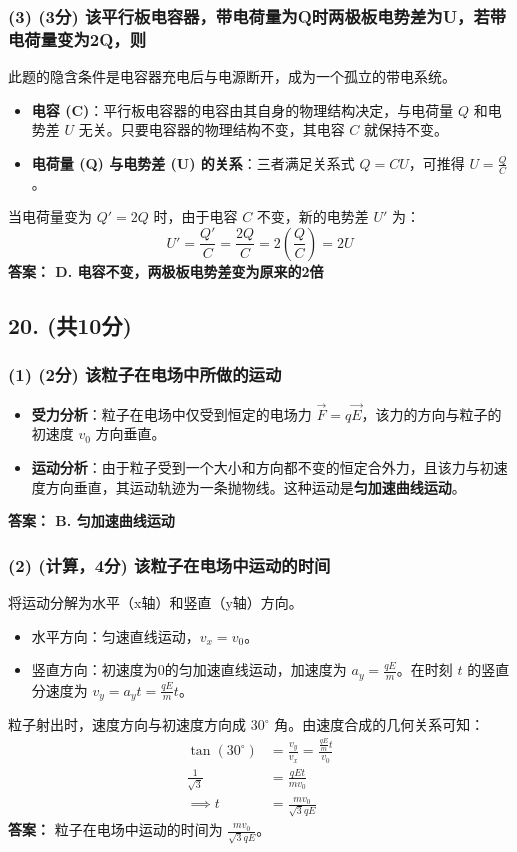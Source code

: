 \documentclass[12pt]{article}
\begin{document}
\subsubsection*{(3) (3分) 该平行板电容器，带电荷量为Q时两极板电势差为U，若带电荷量变为2Q，则}
此题的隐含条件是电容器充电后与电源断开，成为一个孤立的带电系统。
\begin{itemize}
    \item \textbf{电容 (C)}：平行板电容器的电容由其自身的物理结构决定，与电荷量 $Q$ 和电势差 $U$ 无关。只要电容器的物理结构不变，其电容 $C$ 就保持不变。
    \item \textbf{电荷量 (Q) 与电势差 (U) 的关系}：三者满足关系式 $Q = CU$，可推得 $U = \frac{Q}{C}$。
\end{itemize}
当电荷量变为 $Q' = 2Q$ 时，由于电容 $C$ 不变，新的电势差 $U'$ 为：
\[ U' = \frac{Q'}{C} = \frac{2Q}{C} = 2 \left(\frac{Q}{C}\right) = 2U \]
\textbf{答案： D. 电容不变，两极板电势差变为原来的2倍}

\subsection*{20. (共10分)}

\subsubsection*{(1) (2分) 该粒子在电场中所做的运动}
\begin{itemize}
    \item \textbf{受力分析}：粒子在电场中仅受到恒定的电场力 $\vec{F} = q\vec{E}$，该力的方向与粒子的初速度 $v_0$ 方向垂直。
    \item \textbf{运动分析}：由于粒子受到一个大小和方向都不变的恒定合外力，且该力与初速度方向垂直，其运动轨迹为一条抛物线。这种运动是\textbf{匀加速曲线运动}。
\end{itemize}
\textbf{答案： B. 匀加速曲线运动}

\subsubsection*{(2) (计算，4分) 该粒子在电场中运动的时间}
将运动分解为水平（x轴）和竖直（y轴）方向。
\begin{itemize}
    \item 水平方向：匀速直线运动，$v_x = v_0$。
    \item 竖直方向：初速度为0的匀加速直线运动，加速度为 $a_y = \frac{qE}{m}$。在时刻 $t$ 的竖直分速度为 $v_y = a_y t = \frac{qE}{m}t$。
\end{itemize}
粒子射出时，速度方向与初速度方向成 $30^\circ$ 角。由速度合成的几何关系可知：
\begin{align*}
\tan(30^\circ) &= \frac{v_y}{v_x} = \frac{\frac{qE}{m}t}{v_0} \\
\frac{1}{\sqrt{3}} &= \frac{qEt}{mv_0} \\
\implies t &= \frac{mv_0}{\sqrt{3}qE}
\end{align*}
\textbf{答案：} 粒子在电场中运动的时间为 $\displaystyle \frac{mv_0}{\sqrt{3}qE}$。
\end{document}
